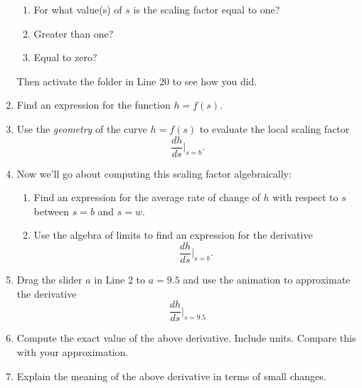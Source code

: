 \documentclass{ximera}
\begin{document}
\begin{question}
\begin{enumerate}
\begin{enumerate}
\item For what value(s) of $s$ is the scaling factor equal to one?

\item Greater than one?

\item Equal to zero?
\end{enumerate}


Then activate the folder in Line 20 to see how you did.



\item Find an expression for the function $h=f(s)$.

\item Use the \emph{geometry} of the curve $h=f(s)$ to evaluate the local scaling factor
\[
   \frac{dh}{ds}\Big|_{s=b} .
\]

\item Now we'll go about computing this scaling factor algebraically:

\begin{enumerate}

\item Find an expression for the average rate of change of $h$ with respect to $s$ between $s=b$ and $s=w$.

\item Use the algebra of limits to find an expression for the derivative
\[
   \frac{dh}{ds}\Big|_{s=b} .
\]

\end{enumerate}

\item Drag the slider $a$ in Line 2 to $a=9.5$ and use the animation to approximate the derivative
\[
  \frac{dh}{ds}\Big|_{s=9.5}
\]

\item Compute the exact value of the above derivative. Include units. Compare this with your approximation.

\item Explain the meaning of the above derivative in terms of small changes.


\end{enumerate}


\end{question}
\end{document}
